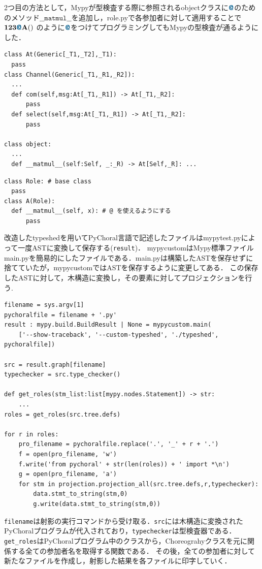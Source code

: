 \documentclass{thesis}
\newcommand{\mblue}[1]{\textbf{\textsf{\color{MidnightBlue}#1}}}
\begin{document}
2つ目の方法として，Mypyが型検査する際に参照されるobjectクラスに$\mblue{@}$のためのメソッド$\texttt{\_\_matmul\_\_}$を追加し，role.pyで各参加者に対して適用することで$\mathbf{123\mblue{@}A()}$
のように$\mblue{@}$をつけてプログラミングしてもMypyの型検査が通るようにした．
\begin{lstlisting}[caption=builtins.pyi]
class At(Generic[_T1,_T2],_T1):
  pass
class Channel(Generic[_T1,_R1,_R2]):
  ... 
  def com(self,msg:At[_T1,_R1]) -> At[_T1,_R2]:
      pass
  def select(self,msg:At[_T1,_R1]) -> At[_T1,_R2]:
      pass

class object:
  ... 
  def __matmul__(self:Self, _:_R) -> At[Self,_R]: ...
\end{lstlisting}
\begin{lstlisting}[caption=role.py]
class Role: # base class
  pass
class A(Role):
  def __matmul__(self, x): # @ を使えるようにする
      pass
\end{lstlisting}
改造したtypeshedを用いてPyChoral言語で記述したファイルはmypytest.pyによって一度ASTに変換して保存する(\texttt{result})．
mypycustomはMypy標準ファイルmain.pyを簡易的にしたファイルである．main.pyは構築したASTを保存せずに捨てていたが，mypycustomではASTを保存するように変更してある．
この保存したASTに対して，木構造に変換し，その要素に対してプロジェクションを行う.
\begin{lstlisting}[caption=mypytest.py,label=mypytest]
filename = sys.argv[1]
pychoralfile = filename + '.py'
result : mypy.build.BuildResult | None = mypycustom.main(
    ['--show-traceback', '--custom-typeshed', './typeshed', pychoralfile])

src = result.graph[filename] 
typechecker = src.type_checker()

def get_roles(stm_list:list[mypy.nodes.Statement]) -> str:
    ... 
roles = get_roles(src.tree.defs)

for r in roles:
    pro_filename = pychoralfile.replace('.', '_' + r + '.')
    f = open(pro_filename, 'w')
    f.write('from pychoral' + str(len(roles)) + ' import *\n') 
    g = open(pro_filename, 'a')
    for stm in projection.projection_all(src.tree.defs,r,typechecker):
        data.stmt_to_string(stm,0)
        g.write(data.stmt_to_string(stm,0))
\end{lstlisting}
\texttt{filename}は射影の実行コマンドから受け取る．\texttt{src}には木構造に変換されたPyChoralプログラムが代入されており，\texttt{typechecker}は型検査器である．
\texttt{get\_roles}はPyChoralプログラム中のクラスから，Choreograhyクラスを元に関係する全ての参加者名を取得する関数である．
その後，全ての参加者に対して新たなファイルを作成し，射影した結果を各ファイルに印字していく．
\end{document}
